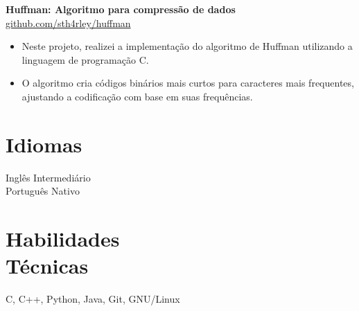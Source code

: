 \documentclass[margin,line]{resume}
\begin{document}
\begin{resume}
     \textbf{Huffman: Algoritmo para compressão de dados} \hfill \url{github.com/sth4rley/huffman}
    \begin{itemize}
        \item Neste projeto, realizei a implementação do algoritmo de Huffman utilizando a linguagem de programação C.
        \item  O algoritmo cria códigos binários mais curtos para caracteres mais frequentes, ajustando a codificação com base em suas frequências.
    \end{itemize}

    \section{\mysidestyle Idiomas}

    Inglês Intermediário\\
    Português Nativo

    \section{\mysidestyle Habilidades\\Técnicas}
    C, C++, Python, Java, Git, GNU/Linux\\

\end{resume}
\end{document}
